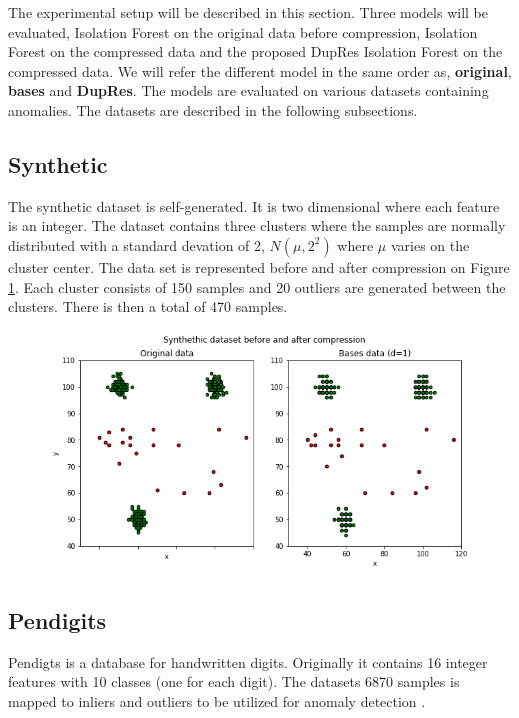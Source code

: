 The experimental setup will be described in this section. Three models will be evaluated, Isolation Forest on the original data before compression, Isolation Forest on the compressed data and the proposed DupRes Isolation Forest on the compressed data. We will refer the different model in the same order as, \textbf{original}, \textbf{bases} and \textbf{DupRes}. The models are evaluated on various datasets containing anomalies. The datasets are described in the following subsections.  

\subsection*{Synthetic}
The synthetic dataset is self-generated. It is two dimensional where each feature is an integer. The dataset contains three clusters where the samples are normally distributed with a standard devation of 2, $N(\mu, 2^2)$ where $\mu$ varies on the cluster center. The data set is represented before and after compression on Figure \ref{fig:synthetic-dataset}. Each cluster consists of 150 samples and 20 outliers are generated between the clusters. There is then a total of 470 samples.    

\begin{figure}
  \centering
  \includegraphics[width=\linewidth]{images/synthethic-dataset.png}
  \caption{}
  \label{fig:synthetic-dataset}
\end{figure}

\subsection*{Pendigits}
Pendigts is a database for handwritten digits. Originally it contains 16 integer features  with 10 classes (one for each digit). The datasets 6870 samples is mapped to inliers and outliers to be utilized for anomaly detection \cite{ODDS}.   

